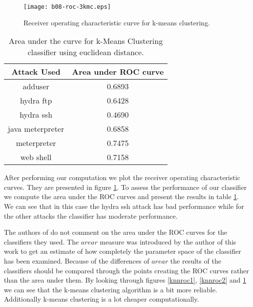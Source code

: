 \documentclass[reqno,openany,12pt]{amsbook}
\begin{document}
\begin{figure}
\texttt{[image: b08-roc-3kmc.eps]}
\caption{Receiver operating characteristic curve for k-means clustering.}
\label{kmcroc1}
\end{figure}

\begin{table}
\begin{tabular}{|c|c|}
\hline
Attack Used &  Area under ROC curve \\ \hline 
adduser          & 0.6893 \\ \hline
hydra ftp        & 0.6428 \\ \hline
hydra ssh        & 0.4690 \\ \hline
java meterpreter & 0.6858 \\ \hline
meterpreter      & 0.7475 \\ \hline
web shell        & 0.7158 \\ \hline
\end{tabular}
\vspace{5pt}
\caption{Area under the curve for k-Means Clustering classifier using euclidean distance.}
\label{kmct1}
\end{table}

%

After performing our computation we plot the receiver operating characteristic curves. They are presented in figure \ref{kmcroc1}. To assess the performance of our classifier we compute the area under the ROC curves and present the results in table \ref{kmct1}. We can see that in this case the hydra ssh attack has bad performance while for the other attacks the classifier has moderate performance.

The authors of \cite{adf1} do not comment on the area under the ROC curves for the classifiers they used.
The $arear$ measure was introduced by the author of this work to get an estimate of how completely the parameter space of the classifier has been examined. Because of the differences of $arear$ the results of the classifiers should be compared through the points creating the ROC curves rather than the area under them. By looking through figures \ref{knnroc1}, \ref{knnroc2} and \ref{kmcroc1} we can see that the k-means clustering algorithm is a bit more reliable.
Additionally k-means clustering is a lot cheaper computationally.
\end{document}
